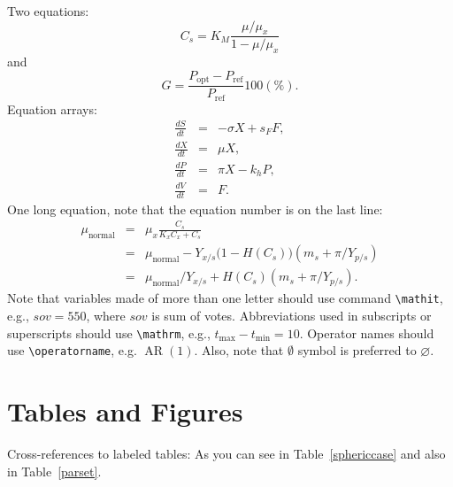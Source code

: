 \documentclass[te,nameyear,final,supplement]{econsocart}
\theoremstyle{plain}
\theoremstyle{definition}
\begin{document}
Two equations:
\begin{equation}
    C_{s}  =  K_{M} \frac{\mu/\mu_{x}}{1-\mu/\mu_{x}} \label{ccs}
\end{equation}
and
\begin{equation}
    G = \frac{P_{\mathrm{opt}} - P_{\mathrm{ref}}}{P_{\mathrm{ref}}}  100(\%).
\end{equation}
Equation arrays:
\begin{eqnarray}
  \frac{dS}{dt} & = & - \sigma X + s_{F} F,\\
  \frac{dX}{dt} & = &   \mu    X,\\
  \frac{dP}{dt} & = &   \pi    X - k_{h} P,\\
  \frac{dV}{dt} & = &   F.
\end{eqnarray}
One long equation, note that the equation number is on the last line:
\begin{eqnarray}
 \mu_{\text{normal}} & = & \mu_{x} \frac{C_{s}}{K_{x}C_{x}+C_{s}}  \nonumber\\
                     & = & \mu_{\text{normal}} - Y_{x/s}\bigl(1-H(C_{s})\bigr)(m_{s}+\pi /Y_{p/s})\nonumber\\
                     & = & \mu_{\text{normal}}/Y_{x/s}+ H(C_{s}) (m_{s}+ \pi /Y_{p/s}).\label{e7}
\end{eqnarray}
Note that variables made of more than one letter should use command \verb|\mathit|,
e.g., $\mathit{sov}=550$, where $\mathit{sov}$ is sum of votes. Abbreviations used in subscripts or superscripts should use \verb|\mathrm|,
e.g., $t_{\mathrm{max}}-t_{\mathrm{min}} =10$. Operator names should use \verb|\operatorname|, e.g. $\operatorname{AR}(1)$. Also, note that $\emptyset$ symbol is preferred to $\varnothing$.

\section{Tables and Figures}
Cross-references to labeled tables: As you can see in Table~\ref{sphericcase}
and also in Table~\ref{parset}.
\end{document}
